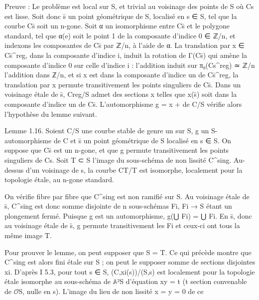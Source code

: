 \documentclass[11pt,a4paper]{article}
\begin{document}
Preuve :     Le problème est local sur S, et trivial au voisinage des points de S où C\textunderscore{}s est lisse. Soit donc s̄ un point géométrique de S, localisé en s ∈ S, tel que la courbe C\textunderscore{}s̄ soit un n-gone. Soit α un isomorphisme entre C\textunderscore{}s̄ et le polygone standard, tel que α(e) soit le point 1 de la composante d'indice 0 ∈ ℤ/n, et indexons les composantes de C\textunderscore{}s̄ par ℤ/n, à l'aide de α. La translation par x ∈ C\textunderscore{}s̄\textasciicircum{}reg, dans la composante d'indice i, induit la rotation de Γ(C\textunderscore{}s̄) qui amène la composante d'indice 0 sur celle d'indice i : l'addition induit sur π₀(C\textunderscore{}s\textasciicircum{}reg) ≃ ℤ/n l'addition dans ℤ/n, et si x est dans la composante d'indice un de C\textunderscore{}s̄\textasciicircum{}reg, la translation par x permute transitivement les points singuliers de C\textunderscore{}s̄. Dans un voisinage étale de s̄, C\textunderscore{}reg/S admet des sections x telles que x(s̄) soit dans la composante d'indice un de C\textunderscore{}s̄. L'automorphisme g = x + de C/S vérifie alors l'hypothèse du lemme suivant.

Lemme 1.16.     Soient C/S une courbe stable de genre un sur S, g un S-automorphisme de C et s̄ un point géométrique de S localisé en s ∈ S. On suppose que C\textunderscore{}s̄ est un n-gone, et que g permute transitivement les points singuliers de C\textunderscore{}s. Soit T ⊂ S l'image du sous-schéma de non lissité C\textasciicircum{}sing. Au-dessus d'un voisinage de s, la courbe C\textunderscore{}T/T est isomorphe, localement pour la topologie étale, au n-gone standard.

On vérifie fibre par fibre que C\textasciicircum{}sing est non ramifié sur S. Au voisinage étale de s̄, C\textasciicircum{}sing est donc somme disjointe de n sous-schémas F\textunderscore{}i, F\textunderscore{}i → S étant un plongement fermé. Puisque g est un automorphisme, g(⋃ F\textunderscore{}i) = ⋃ F\textunderscore{}i. En s̄, donc au voisinage étale de s̄, g permute transitivement les F\textunderscore{}i et ceux-ci ont tous la même image T.

Pour prouver le lemme, on peut supposer que S = T. Ce qui précède montre que C\textasciicircum{}sing est alors fini étale sur S ; on peut le supposer somme de sections disjointes x\textunderscore{}i. D'après I 5.3, pour tout s ∈ S, (C,x\textunderscore{}i(s))/(S,s) est localement pour la topologie étale isomorphe au sous-schéma de \ensuremath{\mathbb{A}}²\textunderscore{}S d'équation xy = t (t section convenable de \ensuremath{\mathcal{O}}\textunderscore{}S, nulle en s). L'image du lieu de non lissité x = y = 0 de ce
\end{document}

